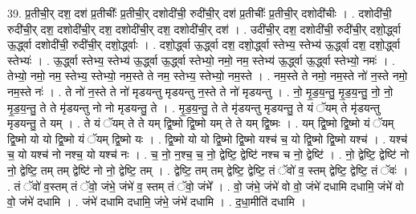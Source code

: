 \documentclass[17pt]{extarticle}
\begin{document}
39. प्र॒तीची॒र् दश॒ दश॑ प्र॒तीचीः᳚ प्र॒तीची॒र् दशोदी॑ची॒ रुदी॑ची॒र् दश॑ प्र॒तीचीः᳚ प्र॒तीची॒र् दशोदी॑चीः । . दशोदी॑ची॒ रुदी॑ची॒र् दश॒ दशोदी॑ची॒र् दश॒ दशोदी॑ची॒र् दश॒ दशोदी॑ची॒र् दश॑ । . उदी॑ची॒र् दश॒ दशोदी॑ची॒ रुदी॑ची॒र् दशो॒र्द्ध्वा ऊ॒र्द्ध्वा दशोदी॑ची॒ रुदी॑ची॒र् दशो॒र्द्ध्वाः । . दशो॒र्द्ध्वा ऊ॒र्द्ध्वा दश॒ दशो॒र्द्ध्वा स्तेभ्य॒ स्तेभ्य॑ ऊ॒र्द्ध्वा दश॒ दशो॒र्द्ध्वा स्तेभ्यः॑ । . ऊ॒र्द्ध्वा स्तेभ्य॒ स्तेभ्य॑ ऊ॒र्द्ध्वा ऊ॒र्द्ध्वा स्तेभ्यो॒ नमो॒ नम॒ स्तेभ्य॑ ऊ॒र्द्ध्वा ऊ॒र्द्ध्वा स्तेभ्यो॒ नमः॑ । . तेभ्यो॒ नमो॒ नम॒ स्तेभ्य॒ स्तेभ्यो॒ नम॒स्ते ते नम॒ स्तेभ्य॒ स्तेभ्यो॒ नम॒स्ते । . नम॒स्ते ते नमो॒ नम॒स्ते नो॑ न॒स्ते नमो॒ नम॒स्ते नः॑ । . ते नो॑ न॒स्ते ते नो॑ मृडयन्तु मृडयन्तु न॒स्ते ते नो॑ मृडयन्तु । . नो॒ मृ॒ड॒य॒न्तु॒ मृ॒ड॒य॒न्तु॒ नो॒ नो॒ मृ॒ड॒य॒न्तु॒ ते ते मृ॑डयन्तु नो नो मृडयन्तु॒ ते । . मृ॒ड॒य॒न्तु॒ ते ते मृ॑डयन्तु मृडयन्तु॒ ते यं ॅयम् ते मृ॑डयन्तु मृडयन्तु॒ ते यम् । . ते यं ॅयम् ते ते यम् द्वि॒ष्मो द्वि॒ष्मो यम् ते ते यम् द्वि॒ष्मः । . यम् द्वि॒ष्मो द्वि॒ष्मो यं ॅयम् द्वि॒ष्मो यो यो द्वि॒ष्मो यं ॅयम् द्वि॒ष्मो यः । . द्वि॒ष्मो यो यो द्वि॒ष्मो द्वि॒ष्मो यश्च॑ च॒ यो द्वि॒ष्मो द्वि॒ष्मो यश्च॑ । . यश्च॑ च॒ यो यश्च॑ नो नश्च॒ यो यश्च॑ नः । . च॒ नो॒ न॒श्च॒ च॒ नो॒ द्वेष्टि॒ द्वेष्टि॑ नश्च च नो॒ द्वेष्टि॑ । . नो॒ द्वेष्टि॒ द्वेष्टि॑ नो नो॒ द्वेष्टि॒ तम् तम् द्वेष्टि॑ नो नो॒ द्वेष्टि॒ तम् । . द्वेष्टि॒ तम् तम् द्वेष्टि॒ द्वेष्टि॒ तं ॅवो॑ व॒ स्तम् द्वेष्टि॒ द्वेष्टि॒ तं ॅवः॑ । . तं ॅवो॑ व॒स्तम् तं ॅवो॒ जंभे॒ जंभे॑ व॒ स्तम् तं ॅवो॒ जंभे᳚ । . वो॒ जंभे॒ जंभे॑ वो वो॒ जंभे॑ दधामि दधामि॒ जंभे॑ वो वो॒ जंभे॑ दधामि । . जंभे॑ दधामि दधामि॒ जंभे॒ जंभे॑ दधामि । . द॒धा॒मीति॑ दधामि । \newline
\pagebreak
\end{document}
